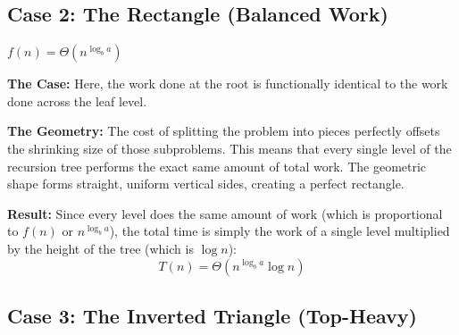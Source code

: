 \documentclass[11pt, a4paper]{article}
\begin{document}
\subsection*{Case 2: The Rectangle (Balanced Work)}

\begin{tcolorbox}[colback=accent3!10, colframe=accent3, title=\textbf{Condition}]
$f(n) = \Theta(n^{\log_b a})$
\end{tcolorbox}
\textbf{The Case:} Here, the work done at the root is functionally identical to the work done across the leaf level.

\textbf{The Geometry:} The cost of splitting the problem into pieces perfectly offsets the shrinking size of those subproblems. This means that every single level of the recursion tree performs the exact same amount of total work. The geometric shape forms straight, uniform vertical sides, creating a perfect rectangle.

\textbf{Result:} Since every level does the same amount of work (which is proportional to $f(n)$ or $n^{\log_b a}$), the total time is simply the work of a single level multiplied by the height of the tree (which is $\log n$):
\begin{equation*}
    T(n) = \Theta(n^{\log_b a} \log n)
\end{equation*}

\vspace{0.5cm}
\begin{center}
\end{center}
\vspace{0.5cm}

\subsection*{Case 3: The Inverted Triangle (Top-Heavy)}
\end{document}
